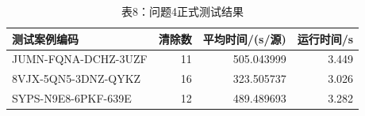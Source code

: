 \begin{table}[htbp]\centering\small
\caption{表8：问题4正式测试结果}
\begin{tabular}{@{}lrrr@{}}\toprule
测试案例编码 & 清除数 & 平均时间/(s/源) & 运行时间/s\\\midrule
JUMN-FQNA-DCHZ-3UZF & 11 & 505.043999 & 3.449\\
8VJX-5QN5-3DNZ-QYKZ & 16 & 323.505737 & 3.026\\
SYPS-N9E8-6PKF-639E & 12 & 489.489693 & 3.282\\\bottomrule
\end{tabular}\end{table}
